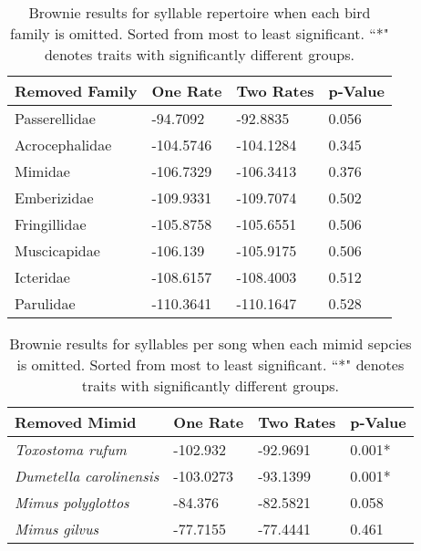 \documentclass[a4paper,12pt]{article}
\begin{document}
\begin{table}[ht]
\caption{Brownie results for syllable repertoire when each bird family is omitted.  Sorted from most to least significant.  ``*" denotes traits with significantly different groups.}
\centering
\begin{tabular}{llll}
  \hline
Removed Family & One Rate & Two Rates & p-Value \\ 
  \hline
Passerellidae & -94.7092 & -92.8835 & 0.056 \\ 
  Acrocephalidae & -104.5746 & -104.1284 & 0.345 \\ 
  Mimidae & -106.7329 & -106.3413 & 0.376 \\ 
  Emberizidae & -109.9331 & -109.7074 & 0.502 \\ 
  Fringillidae & -105.8758 & -105.6551 & 0.506 \\ 
  Muscicapidae & -106.139 & -105.9175 & 0.506 \\ 
  Icteridae & -108.6157 & -108.4003 & 0.512 \\ 
  Parulidae & -110.3641 & -110.1647 & 0.528 \\ 
   \hline
\end{tabular}
\end{table}


\begin{table}[ht]
\caption{Brownie results for syllables per song when each mimid sepcies is omitted.  Sorted from most to least significant.  ``*" denotes traits with significantly different groups.}
\centering
\begin{tabular}{llll}
  \hline
Removed Mimid & One Rate & Two Rates & p-Value \\ 
  \hline
\textit{Toxostoma rufum} & -102.932 & -92.9691 & 0.001* \\ 
  \textit{Dumetella carolinensis} & -103.0273 & -93.1399 & 0.001* \\ 
  \textit{Mimus polyglottos} & -84.376 & -82.5821 & 0.058 \\ 
  \textit{Mimus gilvus} & -77.7155 & -77.4441 & 0.461 \\ 
   \hline
\end{tabular}
\end{table}
\end{document}

